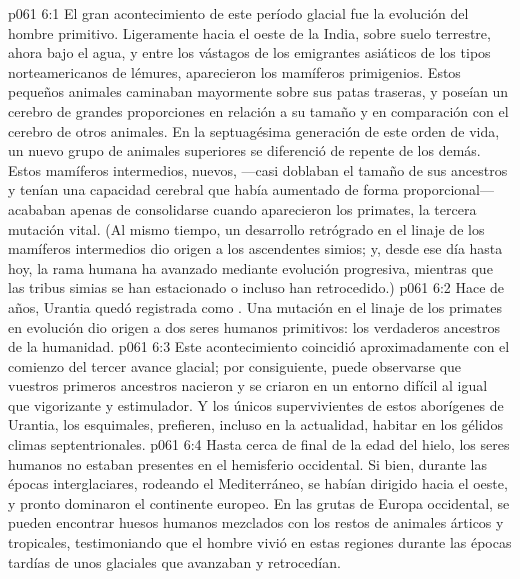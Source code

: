 \vs p061 6:1 El gran acontecimiento de este período glacial fue la evolución del hombre primitivo. Ligeramente hacia el oeste de la India, sobre suelo terrestre, ahora bajo el agua, y entre los vástagos de los emigrantes asiáticos de los tipos norteamericanos de lémures, aparecieron  los mamíferos primigenios. Estos pequeños animales caminaban mayormente sobre sus patas traseras, y poseían un cerebro de grandes proporciones en relación a su tamaño y en comparación con el cerebro de otros animales. En la septuagésima generación de este orden de vida, un nuevo grupo de animales superiores se diferenció de repente de los demás. Estos mamíferos intermedios, nuevos, ---casi doblaban el tamaño de sus ancestros y tenían una capacidad cerebral que había aumentado de forma proporcional--- acababan apenas de consolidarse cuando  aparecieron los primates, la tercera mutación vital. (Al mismo tiempo, un desarrollo retrógrado en el linaje de los mamíferos intermedios dio origen a los ascendentes simios; y, desde ese día hasta hoy, la rama humana ha avanzado mediante evolución progresiva, mientras que las tribus simias se han estacionado o incluso han retrocedido.)
\vs p061 6:2 \pc Hace  de años, Urantia quedó registrada como . Una mutación en el linaje de los primates en evolución dio origen  a dos seres humanos primitivos: los verdaderos ancestros de la humanidad.
\vs p061 6:3 Este acontecimiento coincidió aproximadamente con el comienzo del tercer avance glacial; por consiguiente, puede observarse que vuestros primeros ancestros nacieron y se criaron en un entorno difícil al igual que vigorizante y estimulador. Y los únicos supervivientes de estos aborígenes de Urantia, los esquimales, prefieren, incluso en la actualidad, habitar en los gélidos climas septentrionales.
\vs p061 6:4 \pc Hasta cerca de final de la edad del hielo, los seres humanos no estaban presentes en el hemisferio occidental. Si bien, durante las épocas interglaciares, rodeando el Mediterráneo, se habían dirigido hacia el oeste, y pronto dominaron el continente europeo. En las grutas de Europa occidental, se pueden encontrar huesos humanos mezclados con los restos de animales árticos y tropicales, testimoniando que el hombre vivió en estas regiones durante las épocas tardías de unos glaciales que avanzaban y retrocedían.

